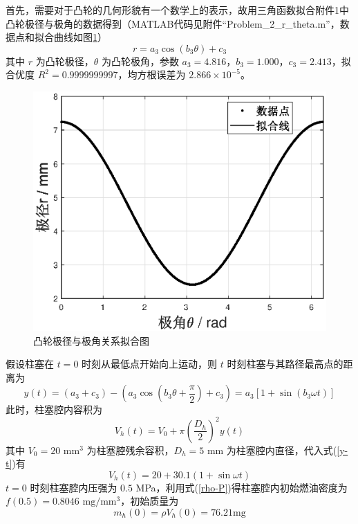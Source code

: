 \documentclass[12pt,a4paper]{article}
\begin{document}
首先，需要对于凸轮的几何形貌有一个数学上的表示，故用三角函数拟合附件1中凸轮极径与极角的数据得到（MATLAB代码见附件“Problem\_2\_r\_theta.m”，数据点和拟合曲线如图\ref{Problem_2_r_theta}）
\begin{equation}
r=a_3\cos(b_3\theta)+c_3
\end{equation}
其中 $r$ 为凸轮极径，$\theta$ 为凸轮极角，参数 $a_3=4.816$，$b_3=1.000$，$c_3=2.413$，拟合优度 $R^2=0.9999999997$，均方根误差为 $2.866\times10^{-5}$。
\begin{figure}[h]
\centering
\includegraphics[scale=0.5]{Problem_2_r_theta.eps}
\caption{凸轮极径与极角关系拟合图}\label{Problem_2_r_theta}
\end{figure}

假设柱塞在 $t=0$ 时刻从最低点开始向上运动，则 $t$ 时刻柱塞与其路径最高点的距离为
\begin{equation}
\label{y-t}
y(t)=(a_3+c_3)-(a_3\cos(b_3\theta+\frac{\pi}{2})+c_3)=a_3[1+\sin(b_3\omega t)]
\end{equation}
此时，柱塞腔内容积为
\begin{equation}
V_h(t)=V_0+\pi(\frac{D_h}{2})^2y(t)
\end{equation}
其中 $V_0=20\text{ mm}^3$ 为柱塞腔残余容积，$D_h=5$ mm 为柱塞腔内直径，代入式(\ref{y-t})有
\begin{equation}
\label{Vh_t}
V_h(t)=20+30.1(1+\sin\omega t)
\end{equation}
$t=0$ 时刻柱塞腔内压强为 $0.5$ MPa，利用式(\ref{rho-P})得柱塞腔内初始燃油密度为 $f(0.5)=0.8046\text{ mg}/\text{mm}^3$，初始质量为
\begin{equation}
m_h(0)=\rho V_h(0)=76.21\text{mg}
\end{equation}
\end{document}
